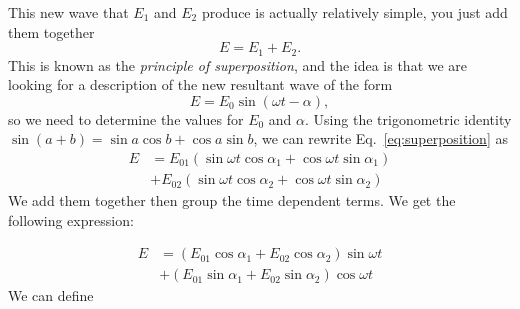 This new wave that $E_1$ and $E_2$ produce is actually relatively simple, you just add them together
\begin{equation}
E=E_1+E_2.
\end{equation}
This is known as the \emph{principle of superposition}, and the idea is that we are looking for a description of the new resultant wave of the form
\begin{equation}
E=E_0 \sin (\omega t-\alpha),
\end{equation}
so we need to determine the values for $E_0$ and $\alpha$. Using the trigonometric identity $\sin (a + b)=\sin a \cos b +\cos a \sin b$, we can rewrite Eq.~\ref{eq:superposition} as
\begin{equation}
\begin{aligned}
E &=E_{01}\left(\sin \omega t \cos \alpha_{1}+\cos \omega t \sin \alpha_{1}\right) \\
&+E_{02}\left(\sin \omega t \cos \alpha_{2}+\cos \omega t \sin \alpha_{2}\right)
\end{aligned}
\end{equation}
We add them together then group the time dependent terms. 
We get the following expression: 

\begin{equation}
\begin{aligned}
E &=\left(E_{01} \cos \alpha_{1}+E_{02} \cos \alpha_{2}\right) \sin \omega t \\
&+\left(E_{01} \sin \alpha_{1}+E_{02} \sin \alpha_{2}\right) \cos \omega t
\end{aligned}
\end{equation}
We can define

